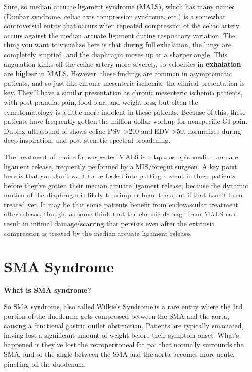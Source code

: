 \documentclass[
]{book}
\begin{document}
Sure, so median arcuate ligament syndrome (MALS), which has many names
(Dunbar syndrome, celiac axis compression syndrome, etc.) is a somewhat
controversial entity that occurs when repeated compression of the celiac
artery occurs against the median arcuate ligament during respiratory
variation. The thing you want to visualize here is that during full
exhalation, the lungs are completely emptied, and the diaphragm moves up
at a sharper angle. This angulation kinks off the celiac artery more
severely, so velocities in \textbf{exhalation} are \textbf{higher} in MALS.
However, these findings are common in asymptomatic patients, and so just
like chronic mesenteric ischemia, the clinical presentation is key.
They'll have a similar presentation as chronic mesenteric ischemia
patients, with post-prandial pain, food fear, and weight loss, but often
the symptomatology is a little more indolent in these patients. Because
of this, these patients have frequently gotten the million dollar workup
for nonspecific GI pain. Duplex ultrasound of shows celiac PSV \textgreater200 and
EDV \textgreater50, normalizes during deep inspiration, and post-stenotic spectral
broadening.\citep{zwolakMesentericCeliacDuplex1998}

The treatment of choice for suspected MALS is a laparoscopic median
arcuate ligament release, frequently performed by a MIS/foregut surgeon.
A key point here is that you don't want to be fooled into putting a
stent in these patients before they've gotten their median arcuate
ligament release, because the dynamic motion of the diaphragm is likely
to crimp or bend the stent if that hasn't been treated yet. It may be
that some patients benefit from endovascular treatment after release,
though, as some think that the chronic damage from MALS can result in
intimal damage/scarring that persists even after the extrinsic
compression is treated by the median arcuate ligament release.

\hypertarget{sma-syndrome}{%
\section{SMA Syndrome}\label{sma-syndrome}}

\textbf{What is SMA syndrome?}

So SMA syndrome, also called Wilkie's Syndrome is a rare entity where
the 3rd portion of the duodenum gets compressed between the SMA and the
aorta, causing a functional gastric outlet obstruction. Patients are
typically emaciated, having lost a significant amount of weight before
their symptom onset. What's happened is they've lost the retroperitoneal
fat pat that normally surrounds the SMA, and so the angle between the
SMA and the aorta becomes more acute, pinching off the duodenum.
\end{document}
